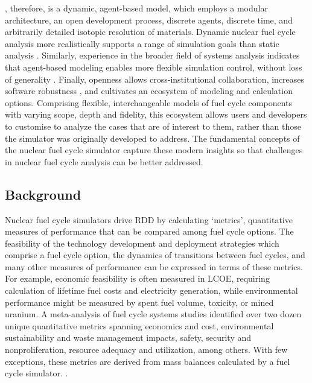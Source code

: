 \Cyclus, therefore, is a dynamic, agent-based model, which employs a modular
architecture, an open development process, discrete agents, discrete time, and
arbitrarily detailed isotopic resolution of materials. Dynamic nuclear fuel
cycle analysis more realistically supports a range of simulation goals than
static analysis \cite{piet_dynamic_2011}. Similarly, experience in the broader
field of systems analysis indicates that agent-based modeling enables more
flexible simulation control, without loss of generality
\cite{macal_agent-based_2010}. Finally, openness allows cross-institutional
collaboration, increases software robustness \cite{cohen_modern_2010}, and
cultivates an ecosystem of modeling and calculation options.  Comprising
flexible, interchangeable models of fuel cycle components with varying scope,
depth and fidelity, this ecosystem allows users and developers to customise
\Cyclus to analyze the cases that are of interest to them, rather than those
the simulator was originally developed to address.  The fundamental concepts of
the \Cyclus nuclear fuel cycle simulator capture these modern insights so that
challenges in nuclear fuel cycle analysis can be better addressed.

\subsection{Background}



Nuclear fuel cycle simulators drive \gls{RDD} by calculating `metrics',
quantitative measures of performance that can be compared among fuel cycle
options. The feasibility of the technology development and deployment
strategies which comprise a fuel cycle option, the dynamics of transitions
between fuel cycles, and many other measures of performance can be expressed in
terms of these metrics. For example, economic feasibility is often measured in
\gls{LCOE}, requiring calculation of lifetime
fuel costs and electricity generation, while environmental performance might be
measured by spent fuel volume, toxicity, or mined uranium.  A meta-analysis of
fuel cycle systems studies identified over two dozen unique quantitative
metrics spanning economics and cost, environmental sustainability and waste
management impacts, safety, security and nonproliferation, resource adequacy
and utilization, among others. With few exceptions, these metrics are derived
from mass balances calculated by a fuel cycle simulator.
\cite{flicker_evaluation_2014}.

